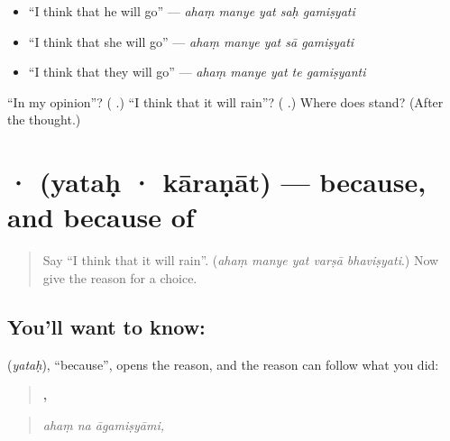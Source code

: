 \begin{itemize}
\raggedright
  \item \textquotedblleft{}I think that he will go\textquotedblright{} — \emph{ahaṃ manye yat saḥ gamiṣyati}
  \item \textquotedblleft{}I think that she will go\textquotedblright{} — \emph{ahaṃ manye yat sā gamiṣyati}
  \item \textquotedblleft{}I think that they will go\textquotedblright{} — \emph{ahaṃ manye yat te gamiṣyanti}
\end{itemize}

\begin{tcolorbox}[breakable,colback=teal!4,colframe=teal!35!black,title={Before you move on}]
\textquotedblleft{}In my opinion\textquotedblright{}? (\textbf{ }.) \textquotedblleft{}I think that it will rain\textquotedblright{}? (\textbf{    }.) Where does \textbf{} stand? (After the thought.)
\end{tcolorbox}
\section[\texorpdfstring{\sk{यतः} · \sk{कारणात्} (yataḥ · kāraṇāt)}{यतः · कारणात् (yataḥ · kāraṇāt)}]{ ·  (yataḥ · kāraṇāt) — because, and because of}

\label{lesson:SA-C278-yatah-karanat}



\begin{quote}
Say \textquotedblleft{}I think that it will rain\textquotedblright{}. (\emph{ahaṃ manye yat varṣā bhaviṣyati}.) Now give the reason for a choice.
\end{quote}

\subsection*{You'll want to know: }
\textbf{} (\emph{yataḥ}), \textquotedblleft{}because\textquotedblright{}, opens the reason, and the reason can follow what you did:

\begin{quote}
\textbf{  ,}
\end{quote}

\begin{quote}
\emph{ahaṃ na āgamiṣyāmi,}
\end{quote}


